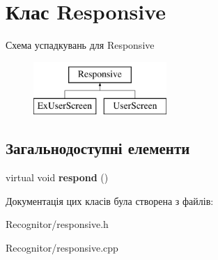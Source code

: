 \hypertarget{classResponsive}{\section{Клас Responsive}
\label{classResponsive}
}
Схема успадкувань для Responsive\begin{figure}[H]
\begin{center}
\leavevmode
\includegraphics[height=2.000000cm]{classResponsive}
\end{center}
\end{figure}
\subsection*{Загальнодоступні елементи}
\begin{DoxyCompactItemize}
\item 
\hypertarget{classResponsive_a961c80379c53ad55f377971a56eaf1dd}{virtual void {\bfseries respond} ()}\label{classResponsive_a961c80379c53ad55f377971a56eaf1dd}

\end{DoxyCompactItemize}


Документація цих класів була створена з файлів\-:\begin{DoxyCompactItemize}
\item 
Recognitor/responsive.\-h\item 
Recognitor/responsive.\-cpp\end{DoxyCompactItemize}
